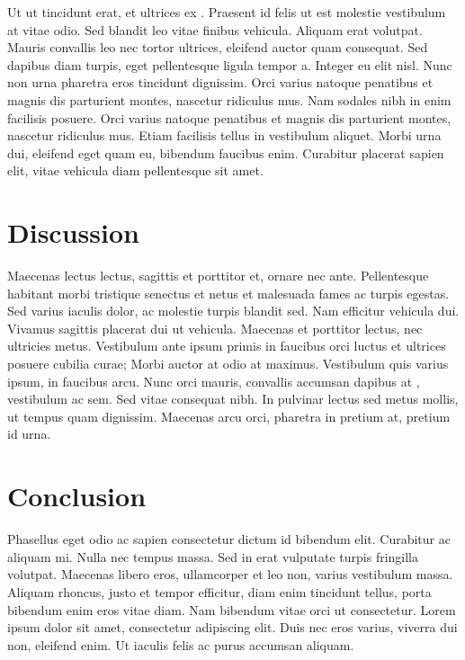 \documentclass[12pt, aps, prb]{revtex4-2}
\begin{document}
Ut ut tincidunt erat, et ultrices ex \cite{baroni2001}. Praesent id felis ut est molestie vestibulum at vitae odio. Sed blandit leo vitae finibus vehicula. Aliquam erat volutpat. Mauris convallis leo nec tortor ultrices, eleifend auctor quam consequat. Sed dapibus diam turpis, eget pellentesque ligula tempor a. Integer eu elit nisl. Nunc non urna pharetra eros tincidunt dignissim. Orci varius natoque penatibus et magnis dis parturient montes, nascetur ridiculus mus. Nam sodales nibh in enim facilisis posuere. Orci varius natoque penatibus et magnis dis parturient montes, nascetur ridiculus mus. Etiam facilisis tellus in vestibulum aliquet. Morbi urna dui, eleifend eget quam eu, bibendum faucibus enim. Curabitur placerat sapien elit, vitae vehicula diam pellentesque sit amet.

\section{Discussion}
\label{sec:discussion}

Maecenas lectus lectus, sagittis et porttitor et, ornare nec ante. Pellentesque habitant morbi tristique senectus et netus et malesuada fames ac turpis egestas. Sed varius iaculis dolor, ac molestie turpis blandit sed. Nam efficitur vehicula dui. Vivamus sagittis placerat dui ut vehicula. Maecenas et porttitor lectus, nec ultricies metus. Vestibulum ante ipsum primis in faucibus orci luctus et ultrices posuere cubilia curae; Morbi auctor at odio at maximus. Vestibulum quis varius ipsum, in faucibus arcu. Nunc orci mauris, convallis accumsan dapibus at \citet{vaswani2023}, vestibulum ac sem. Sed vitae consequat nibh. In pulvinar lectus sed metus mollis, ut tempus quam dignissim. Maecenas arcu orci, pharetra in pretium at, pretium id urna.

\section{Conclusion}
\label{sec:conclusion}

Phasellus eget odio ac sapien consectetur dictum id bibendum elit. Curabitur ac aliquam mi. Nulla nec tempus massa. Sed in erat vulputate turpis fringilla volutpat. Maecenas libero eros, ullamcorper et leo non, varius vestibulum massa. Aliquam rhoncus, justo et tempor efficitur, diam enim tincidunt tellus, porta bibendum enim eros vitae diam. Nam bibendum vitae orci ut consectetur. Lorem ipsum dolor sit amet, consectetur adipiscing elit. Duis nec eros varius, viverra dui non, eleifend enim. Ut iaculis felis ac purus accumsan aliquam.


\end{document}
